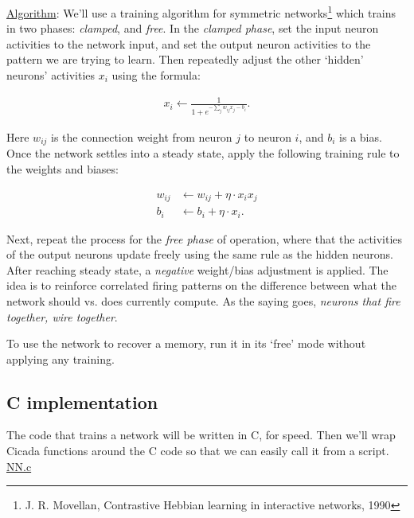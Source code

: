 \documentclass{article}
\begin{document}
\noindent \underline{Algorithm}: We'll use a training algorithm for symmetric networks\footnote{J. R. Movellan, Contrastive Hebbian learning in interactive networks, 1990} which trains in two phases: \emph{clamped}, and \emph{free}.  In the \emph{clamped phase}, set the input neuron activities to the network input, and set the output neuron activities to the pattern we are trying to learn.  Then repeatedly adjust the other `hidden' neurons' activities $x_i$ using the formula:

\begin{align*}
x_i \leftarrow \frac1{1 + e^{-\sum_j w_{ij} x_j - b_i}}.
\end{align*}

\noindent Here $w_{ij}$ is the connection weight from neuron $j$ to neuron $i$, and $b_i$ is a bias.  Once the network settles into a steady state, apply the following training rule to the weights and biases:

\begin{align*}
w_{ij} &\leftarrow w_{ij} + \eta \cdot x_i x_j\\
b_i &\leftarrow b_i + \eta \cdot x_i.
\end{align*}

\noindent Next, repeat the process for the \emph{free phase} of operation, where that the activities of the output neurons update freely using the same rule as the hidden neurons.  After reaching steady state, a \emph{negative} weight/bias adjustment is applied.  The idea is to reinforce correlated firing patterns on the difference between what the network should vs. does currently compute.  As the saying goes, \emph{neurons that fire together, wire together}.

To use the network to recover a memory, run it in its `free' mode without applying any training.



\subsection{C implementation}

The code that trains a network will be written in C, for speed.  Then we'll wrap Cicada functions around the C code so that we can easily call it from a script.\\

\noindent \underline{NN.c}
\end{document}
